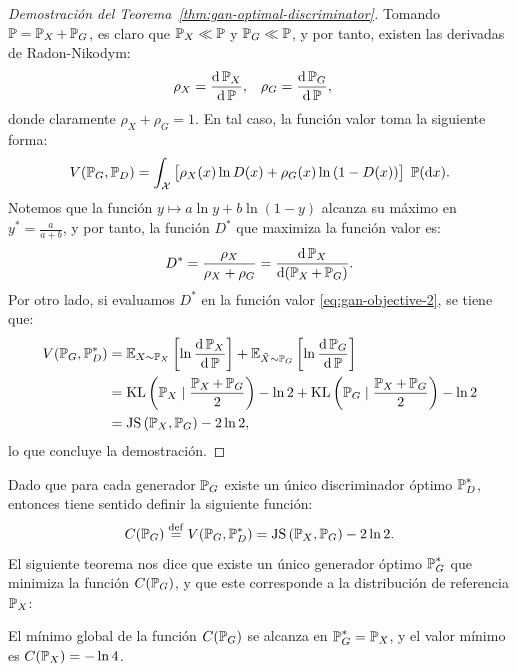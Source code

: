 {{\begin{proof}[Demostración del Teorema~\ref{thm:gan-optimal-discriminator}]
    Tomando $\Prob = \Prob_X + \Prob_G$, es claro que $\Prob_X \ll \Prob$ y $\Prob_G \ll \Prob$, y por tanto, existen las derivadas de Radon-Nikodym:
    \begin{align*}
        \rho_X & = \dv{\Prob_X}{\Prob}, & \rho_G & = \dv{\Prob_G}{\Prob},
    \end{align*}
    donde claramente $\rho_X + \rho_G = 1$. En tal caso, la función valor toma la siguiente forma:
    \begin{equation}
        \label{eq:gan-objective-2}
        V(\Prob_G, \Prob_D) = \int_\cX \big[ \rho_X(x) \ln D(x) + \rho_G(x) \ln \qty(1 - D(x)) \big] \; \Prob(\dd x).
    \end{equation}
    Notemos que la función $y \mapsto a \ln y + b \ln(1-y)$ alcanza su máximo en $y^\ast = \frac{a}{a+b}$, y por tanto, la función $D^\ast$ que maximiza la función valor es:
    \begin{equation}
        D^\ast = \frac{\rho_X}{\rho_X + \rho_G} = \dv{\Prob_X}{(\Prob_X + \Prob_G)} .
    \end{equation}
    Por otro lado, si evaluamos $D^\ast$ en la función valor \eqref{eq:gan-objective-2}, se tiene que:
    \begin{align*}
        V(\Prob_G, \Prob_D^\ast)
         & = \Exp_{X \sim \Prob_X} \left[ \ln \dv{\Prob_X}{\Prob}(X) \right] + \Exp_{\tilde X \sim \Prob_G} \left[ \ln \dv{\Prob_G}{\Prob}(\tilde X) \right] \\
         & = \KL{\Prob_X}{\frac{\Prob_X + \Prob_G}{2}} - \ln 2 + \KL{\Prob_G}{\frac{\Prob_X + \Prob_G}{2}} - \ln 2                                           \\
         & = \JS{\Prob_X}{\Prob_G} - 2 \ln 2,
    \end{align*}
    lo que concluye la demostración.
\end{proof}

Dado que para cada generador $\Prob_G$ existe un único discriminador óptimo $\Prob_D^\ast$, entonces tiene sentido definir la siguiente función:
\begin{equation}
    C(\Prob_G) \eqdef V(\Prob_G, \Prob_D^\ast) = \JS{\Prob_X}{\Prob_G} - 2 \ln 2.
\end{equation}
El siguiente teorema nos dice que existe un único generador óptimo $\Prob_G^\ast$ que minimiza la función $C(\Prob_G)$, y que este corresponde a la distribución de referencia $\Prob_X$:

\begin{theorem}
    El mínimo global de la función $C(\Prob_G)$ se alcanza en $\Prob_G^\ast = \Prob_X$, y el valor mínimo es $C(\Prob_X) = - \ln 4$.
\end{theorem}

}}
